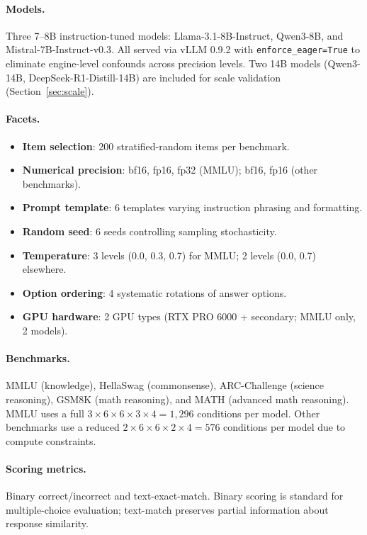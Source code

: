 \documentclass[letterpaper,11pt]{article}
\begin{document}
\paragraph{Models.}
Three 7--8B instruction-tuned models: Llama-3.1-8B-Instruct, Qwen3-8B, and Mistral-7B-Instruct-v0.3.
All served via vLLM 0.9.2 with \texttt{enforce\_eager=True} to eliminate engine-level confounds across precision levels.
Two 14B models (Qwen3-14B, DeepSeek-R1-Distill-14B) are included for scale validation (Section~\ref{sec:scale}).

\paragraph{Facets.}
\begin{itemize}
\item \textbf{Item selection}: 200 stratified-random items per benchmark.
\item \textbf{Numerical precision}: bf16, fp16, fp32 (MMLU); bf16, fp16 (other benchmarks).
\item \textbf{Prompt template}: 6 templates varying instruction phrasing and formatting.
\item \textbf{Random seed}: 6 seeds controlling sampling stochasticity.
\item \textbf{Temperature}: 3 levels (0.0, 0.3, 0.7) for MMLU; 2 levels (0.0, 0.7) elsewhere.
\item \textbf{Option ordering}: 4 systematic rotations of answer options.
\item \textbf{GPU hardware}: 2 GPU types (RTX PRO 6000 + secondary; MMLU only, 2 models).
\end{itemize}

\paragraph{Benchmarks.}
MMLU (knowledge), HellaSwag (commonsense), ARC-Challenge (science reasoning), GSM8K (math reasoning), and MATH (advanced math reasoning).
MMLU uses a full $3 \times 6 \times 6 \times 3 \times 4 = 1{,}296$ conditions per model.
Other benchmarks use a reduced $2 \times 6 \times 6 \times 2 \times 4 = 576$ conditions per model due to compute constraints.

\paragraph{Scoring metrics.}
Binary correct/incorrect and text-exact-match.
Binary scoring is standard for multiple-choice evaluation; text-match preserves partial information about response similarity.
\end{document}
